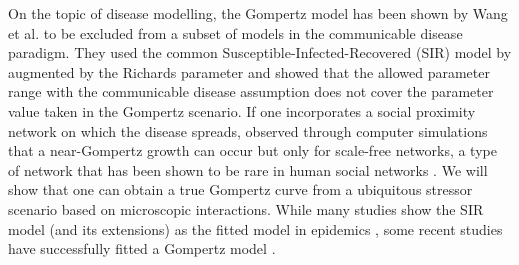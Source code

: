 \documentclass{article}
\begin{document}
On the topic of disease modelling, the Gompertz model has been shown by Wang et al. \cite{wang2012richards} to be excluded from a subset of models in the communicable disease paradigm. They used the common Susceptible-Infected-Recovered (SIR) model by \citet{kermack1927contribution} augmented by the Richards parameter and showed that the allowed parameter range with the communicable disease assumption does not cover the parameter value taken in the Gompertz scenario. If one incorporates a social proximity network on which the disease spreads, \citet{zonta2022virus} observed through computer simulations that a near-Gompertz growth can occur but only for scale-free networks, a type of network that has been shown to be rare in human social networks \cite{clauset2009power,broido2019scale,holme2019rare}. 
We will show that one can obtain a true Gompertz curve from a ubiquitous stressor scenario based on microscopic interactions.
While many studies show the SIR model (and its extensions) as the fitted model in epidemics \cite{carletti2020covid,cooper2020sir,postnikov2020estimation,munoz2021sir,cooper2022dynamical,saikia2021covid}, some recent studies have successfully fitted a Gompertz model \cite{Ohnishi2020,Rypdal2020,Catala2020,rodrigues2020monte,Levitt2020}.
\end{document}
